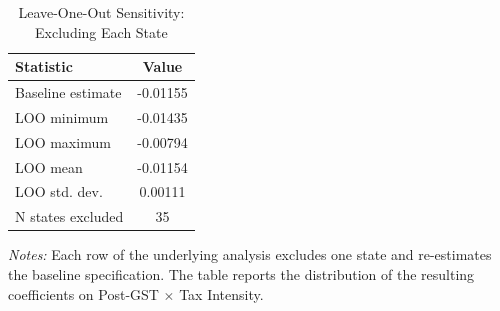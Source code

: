 \begin{table}[htbp]
\centering
\caption{Leave-One-Out Sensitivity: Excluding Each State}
\label{tab:loo}
\begin{tabular}{lc}
\toprule
Statistic & Value \\
\midrule
Baseline estimate & -0.01155 \\
LOO minimum & -0.01435 \\
LOO maximum & -0.00794 \\
LOO mean & -0.01154 \\
LOO std. dev. & 0.00111 \\
N states excluded & 35 \\
\bottomrule
\end{tabular}
\begin{tablenotes}[flushleft]\small
\item \textit{Notes:} Each row of the underlying analysis excludes one state and re-estimates the baseline specification. The table reports the distribution of the resulting coefficients on Post-GST $\times$ Tax Intensity.
\end{tablenotes}
\end{table}
